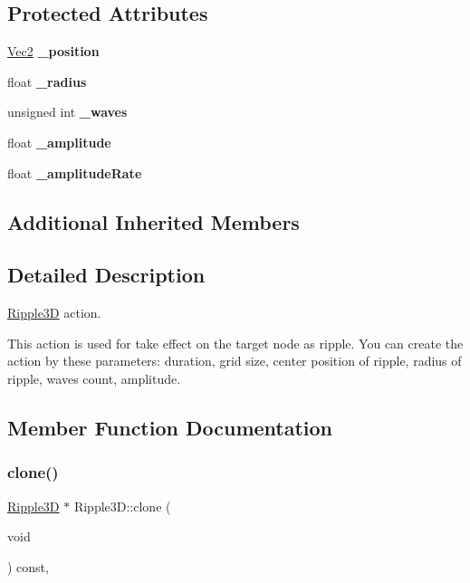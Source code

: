 \subsection*{Protected Attributes}
\begin{DoxyCompactItemize}
\item 
\mbox{\label{classRipple3D_a72a61d90280cb1b5d78a6e7475a0919c}} 
\hyperlink{classVec2}{Vec2} {\bfseries \+\_\+position}
\item 
\mbox{\label{classRipple3D_ac5431aa3b35a3fa0928ce5f95c5b745d}} 
float {\bfseries \+\_\+radius}
\item 
\mbox{\label{classRipple3D_a8d1c3c4796493c5567057f139efe4599}} 
unsigned int {\bfseries \+\_\+waves}
\item 
\mbox{\label{classRipple3D_a6233bd75dd93f32598176fd743df9458}} 
float {\bfseries \+\_\+amplitude}
\item 
\mbox{\label{classRipple3D_abce570861cd20c9575f051f90984e1a0}} 
float {\bfseries \+\_\+amplitude\+Rate}
\end{DoxyCompactItemize}
\subsection*{Additional Inherited Members}


\subsection{Detailed Description}
\hyperlink{classRipple3D}{Ripple3D} action. 

This action is used for take effect on the target node as ripple. You can create the action by these parameters\+: duration, grid size, center position of ripple, radius of ripple, waves count, amplitude. 

\subsection{Member Function Documentation}
\mbox{\label{classRipple3D_a704ef078cca9cde6c85acbcd8e11cc4e}} 
\subsubsection{\texorpdfstring{clone()}{clone()}\hspace{0.1cm}{\footnotesize\ttfamily [1/2]}}
{\footnotesize\ttfamily \hyperlink{classRipple3D}{Ripple3D} $\ast$ Ripple3\+D\+::clone (\begin{DoxyParamCaption}\item[{void}]{ }\end{DoxyParamCaption}) const\hspace{0.3cm}{\ttfamily [override]}, {\ttfamily [virtual]}}

